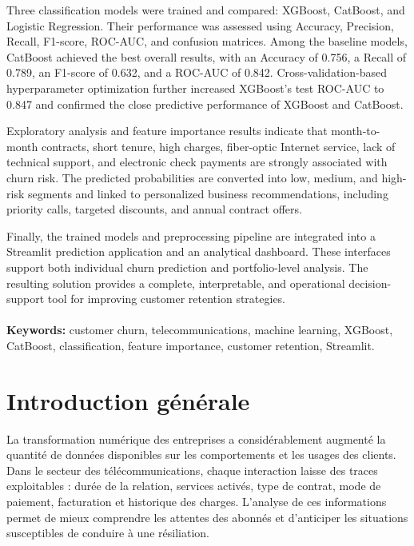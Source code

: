 \documentclass[12pt, a4paper]{article}
\begin{document}
Three classification models were trained and compared: XGBoost, CatBoost, and
Logistic Regression. Their performance was assessed using Accuracy, Precision,
Recall, F1-score, ROC-AUC, and confusion matrices. Among the baseline models,
CatBoost achieved the best overall results, with an Accuracy of 0.756, a Recall
of 0.789, an F1-score of 0.632, and a ROC-AUC of 0.842. Cross-validation-based
hyperparameter optimization further increased XGBoost's test ROC-AUC to 0.847
and confirmed the close predictive performance of XGBoost and CatBoost.

Exploratory analysis and feature importance results indicate that month-to-month
contracts, short tenure, high charges, fiber-optic Internet service, lack of
technical support, and electronic check payments are strongly associated with
churn risk. The predicted probabilities are converted into low, medium, and
high-risk segments and linked to personalized business recommendations,
including priority calls, targeted discounts, and annual contract offers.

Finally, the trained models and preprocessing pipeline are integrated into a
Streamlit prediction application and an analytical dashboard. These interfaces
support both individual churn prediction and portfolio-level analysis. The
resulting solution provides a complete, interpretable, and operational
decision-support tool for improving customer retention strategies.\\\\


\noindent\textbf{Keywords:} customer churn, telecommunications, machine
learning, XGBoost, CatBoost, classification, feature importance, customer
retention, Streamlit.

\newpage
\tableofcontents
\newpage

{}
\listoffigures
\newpage

{}
\listoftables
\newpage

\section*{Introduction générale}

La transformation numérique des entreprises a considérablement augmenté la
quantité de données disponibles sur les comportements et les usages des
clients. Dans le secteur des télécommunications, chaque interaction laisse des
traces exploitables : durée de la relation, services activés, type de contrat,
mode de paiement, facturation et historique des charges. L'analyse de ces
informations permet de mieux comprendre les attentes des abonnés et
d'anticiper les situations susceptibles de conduire à une résiliation.
\end{document}
